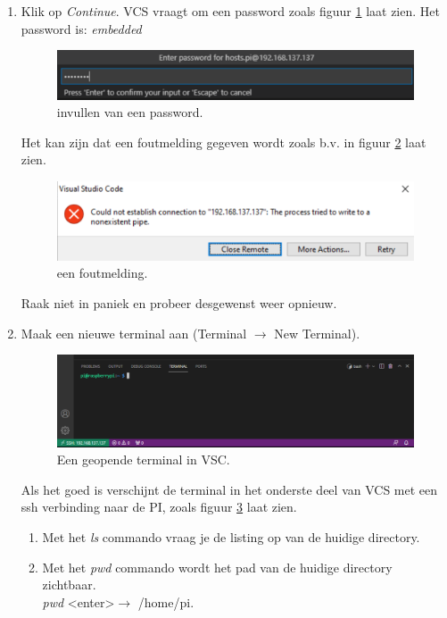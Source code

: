 \begin{enumerate}
\begin{enumerate}
	     \item Klik op \textit{Continue}. VCS vraagt om een password zoals figuur \ref{fig:vscVrPasswd} laat zien. Het password is: \textit{embedded} 
		    \begin{figure}[h!]
	\captionsetup{justification=centering}
	\includegraphics[width=0.7 \linewidth]{figuren/VSCpasswd}
	\centering
	\caption{invullen van een password.}
	\label{fig:vscVrPasswd}
\end{figure}	

Het kan zijn dat een foutmelding gegeven wordt zoals b.v. in figuur \ref{fig:vscfout1} laat zien. 
		    \begin{figure}[h!]
	\captionsetup{justification=centering}
	\includegraphics[width=0.6 \linewidth]{figuren/VSCfout1}
	\centering
	\caption{een foutmelding.}
	\label{fig:vscfout1}
\end{figure}	
Raak niet in paniek en probeer desgewenst weer opnieuw.
\item Maak een nieuwe terminal aan (Terminal $\rightarrow$ New Terminal). 
\begin{figure}[h!]
	\captionsetup{justification=centering}
	\includegraphics[width=0.6 \linewidth]{figuren/VSCnewTerminal}
	\centering
	\caption{Een geopende terminal in VSC.}
	\label{fig:vscnewTerm}
\end{figure}	
Als het goed is verschijnt de terminal in het onderste deel van VCS met een ssh verbinding naar de PI, zoals figuur \ref{fig:vscnewTerm} laat zien. 
\begin{enumerate}
	\item Met het \textit{ls} commando vraag je de listing op van de huidige directory.
	\item Met het \textit{pwd} commando wordt het pad van de huidige directory zichtbaar.\\
	\textit{pwd} \textless enter\textgreater $\rightarrow$  /home/pi.

\end{enumerate}
\end{enumerate}
\end{enumerate}
